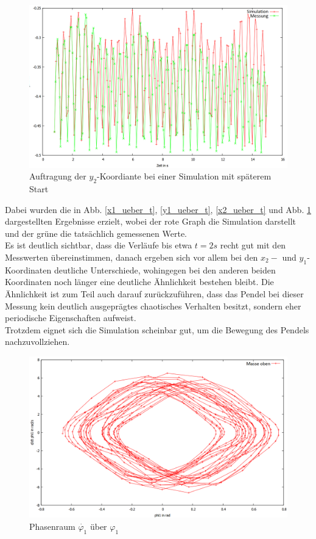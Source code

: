 \begin{figure}
        \includegraphics[width=.9\textwidth]{images/y2_ueber_t_neu.png}
\caption{Auftragung der $y_2$-Koordiante bei einer Simulation mit späterem Start}
\label{y2_ueber_t}
\end{figure}

Dabei wurden die in Abb. \ref{x1_ueber_t}, \ref{y1_ueber_t}, \ref{x2_ueber_t} und Abb. \ref{y2_ueber_t} dargestellten Ergebnisse erzielt, wobei der rote Graph die Simulation darstellt und der grüne die tatsächlich gemessenen Werte. \\
Es ist deutlich sichtbar, dass die Verläufe bis etwa $ t = 2 s $ recht gut mit den Messwerten übereinstimmen, danach ergeben sich vor allem bei den $x_2- $ und $ y_1$-Koordinaten deutliche Unterschiede, wohingegen bei den anderen beiden Koordinaten noch länger eine deutliche Ähnlichkeit bestehen bleibt. Die Ähnlichkeit ist zum Teil auch darauf zurückzuführen, dass das Pendel bei dieser Messung kein deutlich ausgeprägtes chaotisches Verhalten besitzt, sondern eher periodische Eigenschaften aufweist. \\
Trotzdem eignet sich die Simulation scheinbar gut, um die Bewegung des Pendels nachzuvollziehen. 

\begin{figure}
        \includegraphics[width=.9\textwidth]{images/phi1_ueberphi1_neu.png}
\caption{Phasenraum $\dot{\varphi_1} $ über $\varphi_1$}
\label{phi1}
\end{figure}

